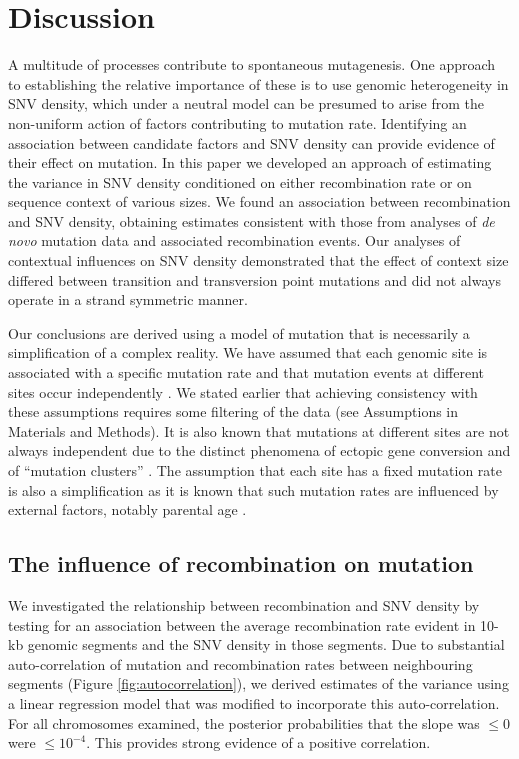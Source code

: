 \section*{Discussion}

A multitude of processes contribute to spontaneous mutagenesis. One approach to establishing the relative importance of these is to use genomic heterogeneity in SNV density, which under a neutral model can be presumed to arise from the non-uniform action of factors contributing to mutation rate.  Identifying an association between candidate factors and SNV density can provide evidence of their effect on mutation.  In this paper we developed an approach of estimating the variance in SNV density conditioned on either recombination rate or on sequence context of various sizes.  We found an association between recombination and SNV density, obtaining estimates consistent with those from analyses of \textit{de novo} mutation data and associated recombination events.  Our analyses of contextual influences on SNV density demonstrated that the effect of context size differed between transition and transversion point mutations and did not always operate in a strand symmetric manner.

Our conclusions are derived using a model of mutation that is necessarily a simplification of a complex reality. We have assumed that each genomic site is associated with a specific mutation rate and that mutation events at different sites occur independently \citep[e.g.][]{Hodgkinson2009}. We stated earlier that achieving consistency with these assumptions requires some filtering of the data (see Assumptions in Materials and Methods). It is also known that mutations at different sites are not always independent due to the distinct phenomena of ectopic gene conversion \citep{harpak2017frequent} and of ``mutation clusters'' \citep{michaelson2012whole}. The assumption that each site has a fixed mutation rate is also a simplification as it is known that such mutation rates are influenced by external factors, notably parental age \citep[e.g.][]{francioli2015genome}.

\subsection*{The influence of recombination on mutation}

We investigated the relationship between recombination and SNV density by testing for an association between the average recombination rate evident in 10-kb genomic segments and the SNV density in those segments. Due to substantial auto-correlation of mutation and recombination rates between neighbouring segments (Figure \ref{fig:autocorrelation}), we derived estimates of the variance  using a linear regression model that was modified to incorporate this auto-correlation.  For all chromosomes examined, the posterior probabilities that the slope was $\leq 0$ were $\leq 10^{-4}$. This provides strong evidence of a positive correlation.

